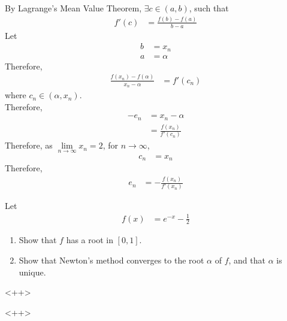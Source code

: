 \documentclass[fleqn, a4paper, 12pt, twoside]{article}
\theoremstyle{definition}
\theoremstyle{theorem}
\begin{document}
\begin{solution}
	By Lagrange's Mean Value Theorem, $\exists c \in (a,b)$, such that
	\begin{align*}
		f'(c) & = \frac{f(b) - f(a)}{b - a}
	\end{align*}
	Let
	\begin{align*}
		b & = x_n \\
		a & = \alpha
	\end{align*}
	Therefore,
	\begin{align*}
		\frac{f(x_n) - f(\alpha)}{x_n - \alpha} & = f'(c_n)
	\end{align*}
	where $c_n \in (\alpha,x_n)$.\\
	Therefore,
	\begin{align*}
		-e_n & = x_n - \alpha \\
                     & = \frac{f(x_n)}{f'(c_n)}
	\end{align*}
	Therefore, as $\lim\limits_{n \to \infty} x_n = 2$, for $n \to \infty$,
	\begin{align*}
		c_n & = x_n
	\end{align*}
	Therefore,
	\begin{align*}
		e_n & = -\frac{f(x_n)}{f'(x_n)}
	\end{align*}
\end{solution}

\begin{question}
	Let 
	\begin{align*}
		f(x) & = e^{-x} - \frac{1}{2}
	\end{align*}
	\begin{enumerate}
		\item Show that $f$ has a root in $[0,1]$.
		\item Show that Newton's method converges to the root $\alpha$ of $f$, and that $\alpha$ is unique.
	\end{enumerate}<++>
\end{question}<++>
\end{document}
